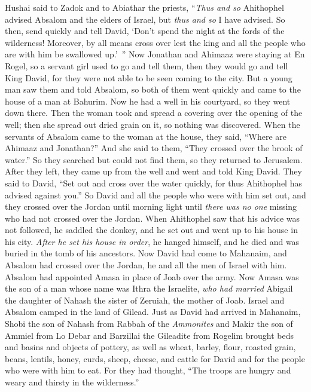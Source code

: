 \begin{biblechapter}
 Hushai said to Zadok and to Abiathar the priests, “\textit{Thus and so} Ahithophel advised Absalom and the elders of Israel, but \textit{thus and so} I have advised.
\verse So then, send quickly and tell David, ‘Don’t spend the night at the fords of the wilderness! Moreover, by all means cross over lest the king and all the people who are with him be swallowed up.’ ”
\verse Now Jonathan and Ahimaaz were staying at En Rogel, so a servant girl used to go and tell them, then they would go and tell King David, for they were not able to be seen coming to the city.
\verse But a young man saw them and told Absalom, so both of them went quickly and came to the house of a man at Bahurim. Now he had a well in his courtyard, so they went down there.
\verse Then the woman took and spread a covering over the opening of the well; then she spread out dried grain on it, so nothing was discovered.
\verse When the servants of Absalom came to the woman at the house, they said, “Where are Ahimaaz and Jonathan?” And she said to them, “They crossed over the brook of water.” So they searched but could not find them, so they returned to Jerusalem.
\verse After they left, they came up from the well and went and told King David. They said to David, “Set out and cross over the water quickly, for thus Ahithophel has advised against you.”
\verse So David and all the people who were with him set out, and they crossed over the Jordan until morning light until \textit{there was no one} missing who had not crossed over the Jordan.
\verse When Ahithophel saw that his advice was not followed, he saddled the donkey, and he set out and went up to his house in his city. \textit{After he set his house in order}, he hanged himself, and he died and was buried in the tomb of his ancestors.
\verse Now David had come to Mahanaim, and Absalom had crossed over the Jordan, he and all the men of Israel with him.
\verse Absalom had appointed Amasa in place of Joab over the army. Now Amasa was the son of a man whose name was Ithra the Israelite, \textit{who had married} Abigail the daughter of Nahash the sister of Zeruiah, the mother of Joab.
\verse Israel and Absalom camped in the land of Gilead.
\verse Just as David had arrived in Mahanaim, Shobi the son of Nahash from Rabbah of the \textit{Ammonites} and Makir the son of Ammiel from Lo Debar and Barzillai the Gileadite from Rogelim
\verse brought beds and basins and objects of pottery, as well as wheat, barley, flour, roasted grain, beans, lentils,
\verse honey, curds, sheep, cheese, and cattle for David and for the people who were with him to eat. For they had thought, “The troops are hungry and weary and thirsty in the wilderness.”
\end{biblechapter}

